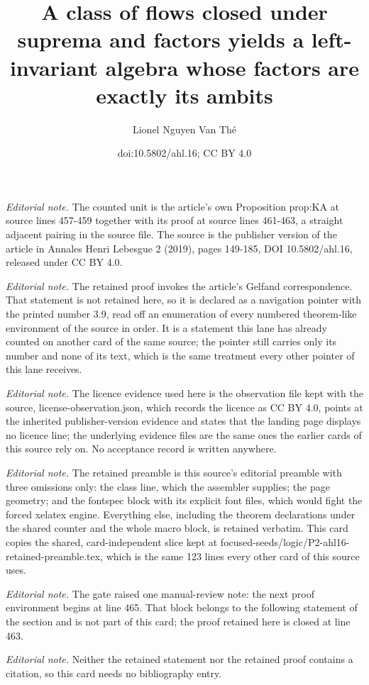 \documentclass[10pt,a4paper]{article}
\title{A class of flows closed under suprema and factors yields a left-invariant algebra whose factors are exactly its ambits}
\author{Lionel Nguyen Van Thé}
\date{doi:10.5802/ahl.16; CC BY 4.0}
\theoremstyle{definition}
\numberwithin{equation}{section}
\numberwithin{figure}{section}
\numberwithin{table}{section}
\begin{document}
\maketitle
\noindent\textit{Editorial note.} The counted unit is the article's own Proposition prop:KA at source lines 457-459 together with its proof at source lines 461-463, a straight adjacent pairing in the source file. The source is the publisher version of the article in Annales Henri Lebesgue 2 (2019), pages 149-185, DOI 10.5802/ahl.16, released under CC BY 4.0.\par\medskip
\noindent\textit{Editorial note.} The retained proof invokes the article's Gelfand correspondence. That statement is not retained here, so it is declared as a navigation pointer with the printed number 3.9, read off an enumeration of every numbered theorem-like environment of the source in order. It is a statement this lane has already counted on another card of the same source; the pointer still carries only its number and none of its text, which is the same treatment every other pointer of this lane receives.\par\medskip
\noindent\textit{Editorial note.} The licence evidence used here is the observation file kept with the source, license-observation.json, which records the licence as CC BY 4.0, points at the inherited publisher-version evidence and states that the landing page displays no licence line; the underlying evidence files are the same ones the earlier cards of this source rely on. No acceptance record is written anywhere.\par\medskip
\noindent\textit{Editorial note.} The retained preamble is this source's editorial preamble with three omissions only: the class line, which the assembler supplies; the page geometry; and the fontspec block with its explicit font files, which would fight the forced xelatex engine. Everything else, including the theorem declarations under the shared counter and the whole macro block, is retained verbatim. This card copies the shared, card-independent slice kept at focused-seeds/logic/P2-ahl16-retained-preamble.tex, which is the same 123 lines every other card of this source uses.\par\medskip
\noindent\textit{Editorial note.} The gate raised one manual-review note: the next proof environment begins at line 465. That block belongs to the following statement of the section and is not part of this card; the proof retained here is closed at line 463.\par\medskip
\noindent\textit{Editorial note.} Neither the retained statement nor the retained proof contains a citation, so this card needs no bibliography entry.\par\medskip
\end{document}
